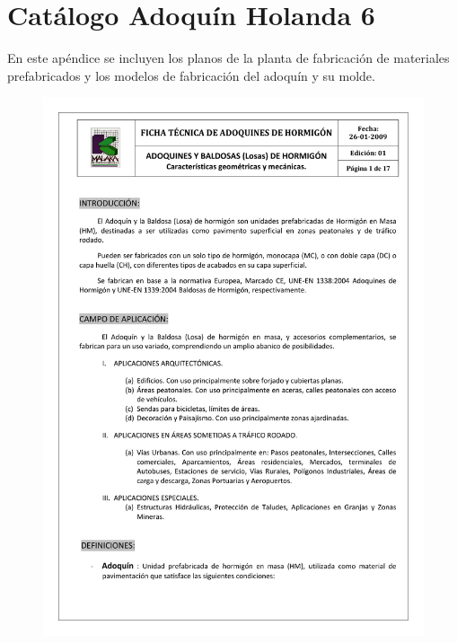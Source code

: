 \chapter{Catálogo Adoquín Holanda 6}\label{apend:catalogo}
En este apéndice se incluyen los planos de la planta de fabricación de materiales prefabricados y los modelos de fabricación del adoquín y su molde.

\newpage
\begin{figure}[!htb]
\centering
\includegraphics[scale=0.68]{ficha_tecnica/ft_adoquin_1.pdf}
\label{fig:ftadoquin1}
\end{figure}
\newpage
